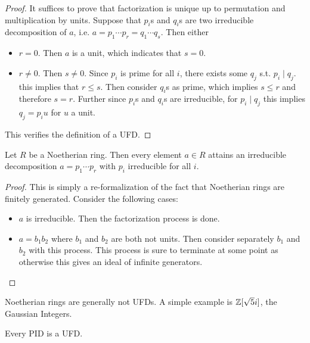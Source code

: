 \begin{proof}
    It suffices to prove that factorization is unique up to permutation and multiplication by units. Suppose that $p_i$s and $q_i$s are two irreducible decomposition of $a$, i.e. $a = p_1\cdots p_r = q_1 \cdots q_s$. Then either
    \begin{itemize}
        \item $r = 0$. Then $a$ is a unit, which indicates that $s = 0$.
        \item $r\neq 0$. Then $s\neq 0$. Since $p_i$ is prime for all $i$, there exists some $q_j$ s.t. $p_i \mid q_j$. this implies that $r\leq s$. Then consider $q_i$s as prime, which implies $s\leq r$ and therefore $s = r$. Further since $p_i$s and $q_i$s are irreducible, for $p_i \mid q_j$ this implies $q_j = p_i u$ for $u$ a unit. 
    \end{itemize}
    This verifies the definition of a UFD.
\end{proof}

\begin{proposition}\label{prop:Noeth implies decomposition}
    Let $R$ be a Noetherian ring. Then every element $a\in R$ attains an irreducible decomposition $a = p_1\cdots p_r$ with $p_i$ irreducible for all $i$. 
\end{proposition}

\begin{proof}
    This is simply a re-formalization of the fact that Noetherian rings are finitely generated. Consider the following cases:
    \begin{itemize}
        \item $a$ is irreducible. Then the factorization process is done.
        \item $a = b_1 b_2$ where $b_1$ and $b_2$ are both not units. Then consider separately $b_1$ and $b_2$ with this process. This process is sure to terminate at some point as otherwise this gives an ideal of infinite generators.
    \end{itemize}
\end{proof}

\begin{remark}
    Noetherian rings are generally not UFDs. A simple example is $\mathbb{Z}[\sqrt{5}i]$, the Gaussian Integers.
\end{remark}

\begin{theorem}\label{thm:PID is UFD}
    Every PID is a UFD.
\end{theorem}

